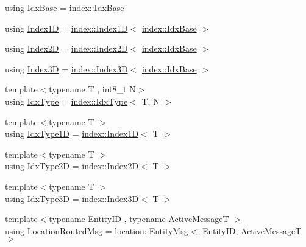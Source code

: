 \begin{DoxyCompactItemize}
\item 
using \hyperlink{namespacevt_afb96657e28fa98eb685c5e0c6b1b122e}{Idx\+Base} = \hyperlink{namespacevt_1_1index_a0dbb8d47463da27c1436e8e4ddb02743}{index\+::\+Idx\+Base}
\item 
using \hyperlink{namespacevt_a5540efc78234273e1796fb003fe4d234}{Index1D} = \hyperlink{namespacevt_1_1index_a091a4f5a7a2c993d9727eaa60cf67d81}{index\+::\+Index1D}$<$ \hyperlink{namespacevt_1_1index_a0dbb8d47463da27c1436e8e4ddb02743}{index\+::\+Idx\+Base} $>$
\item 
using \hyperlink{namespacevt_a3bab786053b74a3d856fff1412ffa73a}{Index2D} = \hyperlink{namespacevt_1_1index_a8373801efc8343f24d6e8ba57df40a69}{index\+::\+Index2D}$<$ \hyperlink{namespacevt_1_1index_a0dbb8d47463da27c1436e8e4ddb02743}{index\+::\+Idx\+Base} $>$
\item 
using \hyperlink{namespacevt_a2c8053bc5f2df4934272542fb3e5a0bc}{Index3D} = \hyperlink{namespacevt_1_1index_a2c09a09f7346d370a0bcbbfb0d4459cd}{index\+::\+Index3D}$<$ \hyperlink{namespacevt_1_1index_a0dbb8d47463da27c1436e8e4ddb02743}{index\+::\+Idx\+Base} $>$
\item 
{\footnotesize template$<$typename T , int8\+\_\+t N$>$ }\\using \hyperlink{namespacevt_a906c25b521ff516f5e8ba6d96fe2d424}{Idx\+Type} = \hyperlink{namespacevt_1_1index_a939bace7aba6cd4a76b2c12a138c5991}{index\+::\+Idx\+Type}$<$ T, N $>$
\item 
{\footnotesize template$<$typename T $>$ }\\using \hyperlink{namespacevt_a36127c6500f2311908c959be653da40e}{Idx\+Type1D} = \hyperlink{namespacevt_1_1index_a091a4f5a7a2c993d9727eaa60cf67d81}{index\+::\+Index1D}$<$ T $>$
\item 
{\footnotesize template$<$typename T $>$ }\\using \hyperlink{namespacevt_ab0fbc5ddf69b5aa0ed6a8d1658b504eb}{Idx\+Type2D} = \hyperlink{namespacevt_1_1index_a8373801efc8343f24d6e8ba57df40a69}{index\+::\+Index2D}$<$ T $>$
\item 
{\footnotesize template$<$typename T $>$ }\\using \hyperlink{namespacevt_a65e4a83c0567ecb7a54b78e9b8e7d7ab}{Idx\+Type3D} = \hyperlink{namespacevt_1_1index_a2c09a09f7346d370a0bcbbfb0d4459cd}{index\+::\+Index3D}$<$ T $>$
\item 
{\footnotesize template$<$typename Entity\+ID , typename Active\+MessageT $>$ }\\using \hyperlink{namespacevt_a0cb65f2151629893480ef391def4e733}{Location\+Routed\+Msg} = \hyperlink{structvt_1_1location_1_1_entity_msg}{location\+::\+Entity\+Msg}$<$ Entity\+ID, Active\+MessageT $>$

\end{DoxyCompactItemize}
